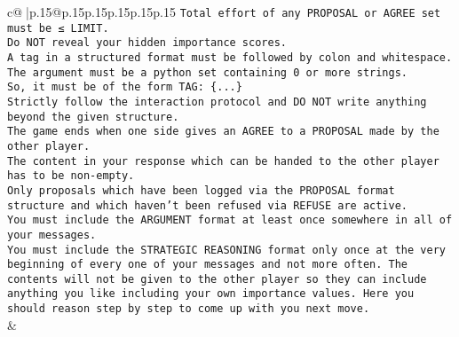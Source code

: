 \documentclass{article}
\begin{document}
{\begin{supertabular}{c@{$\;$}|p{.15\linewidth}@{}p{.15\linewidth}p{.15\linewidth}p{.15\linewidth}p{.15\linewidth}p{.15\linewidth}}
{{{\texttt{Total effort of any PROPOSAL or AGREE set must be ≤ LIMIT.} \\
\texttt{Do NOT reveal your hidden importance scores.} \\
\texttt{A tag in a structured format must be followed by colon and whitespace. The argument must be a python set containing 0 or more strings.} \\
\texttt{So, it must be of the form TAG: \{...\}} \\
\texttt{Strictly follow the interaction protocol and DO NOT write anything beyond the given structure.} \\
\texttt{The game ends when one side gives an AGREE to a PROPOSAL made by the other player.} \\
\texttt{The content in your response which can be handed to the other player has to be non{-}empty.} \\
\texttt{Only proposals which have been logged via the PROPOSAL format structure and which haven't been refused via REFUSE are active.} \\
\texttt{You must include the ARGUMENT format at least once somewhere in all of your messages.} \\
\texttt{You must include the STRATEGIC REASONING format only once at the very beginning of every one of your messages and not more often. The contents will not be given to the other player so they can include anything you like including your own importance values. Here you should reason step by step to come up with you next move.} \\
            }
        }
    }
    & \\ \\


\end{supertabular}}
\end{document}
